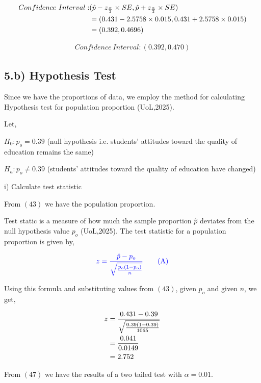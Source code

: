 \documentclass[a4paper]{report}
\begin{document}
\begin{align}
    \notag Confidence\ Interval:&(\hat{p}-z_{\frac{\alpha}{2}}\times SE, \hat{p}+z_{\frac{\alpha}{2}}\times SE) \\
    \notag &=(0.431-2.5758\times0.015,0.431+2.5758\times0.015) \\
    &=(0.392,0.4696)
\end{align}

\begin{align*}
    \boxed{Confidence\ Interval: (0.392,0.470) }
\end{align*}

\newpage
\subsection*{5.b) Hypothesis Test}

Since we have the proportions of data, we employ the method for calculating Hypothesis test for population proportion (UoL,2025).

Let,

$H_0 :p_o = 0.39$ (null hypothesis i.e. students’ attitudes toward the quality of education remains the same)

$H_a:p_o \neq 0.39$ (students’ attitudes toward the quality of education have changed)

i) Calculate test statistic

From $(43)$ we have the population proportion.

Test static is a measure of how much the sample proportion $\hat{p}$ deviates from the null hypothesis value $p_o$ (UoL,2025). The test statistic for a population proportion is given by,

\begin{equation*}
    \color{blue} z=\frac{\hat{p}-p_o}{\sqrt{\frac{p_o(1-p_o)}{n}}} \tag{A}
\end{equation*}

Using this formula and substituting values from $(43)$, given $p_o$ and given $n$, we get,

\begin{align}
    \notag z&=\frac{0.431-0.39}{\sqrt{\frac{0.39(1-0.39)}{1065}}} \\
    \notag &=\frac{0.041}{0.0149} \\&=2.752
\end{align}



From $(47)$ we have the results of a two tailed  test with $\alpha=0.01$.
\end{document}
